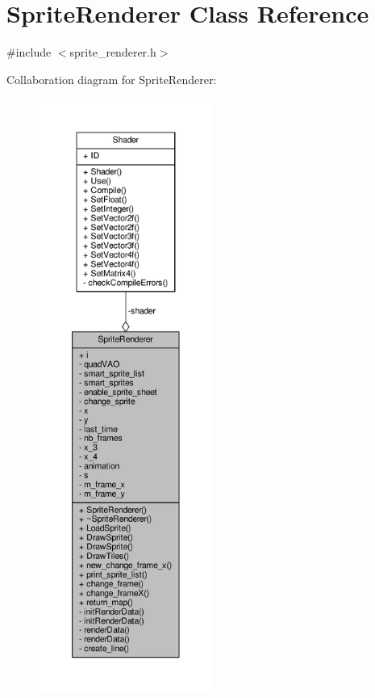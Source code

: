\hypertarget{classSpriteRenderer}{}\section{Sprite\+Renderer Class Reference}
\label{classSpriteRenderer}


{\ttfamily \#include $<$sprite\+\_\+renderer.\+h$>$}



Collaboration diagram for Sprite\+Renderer\+:
\nopagebreak
\begin{figure}[H]
\begin{center}
\leavevmode
\includegraphics[height=550pt]{classSpriteRenderer__coll__graph}
\end{center}
\end{figure}
